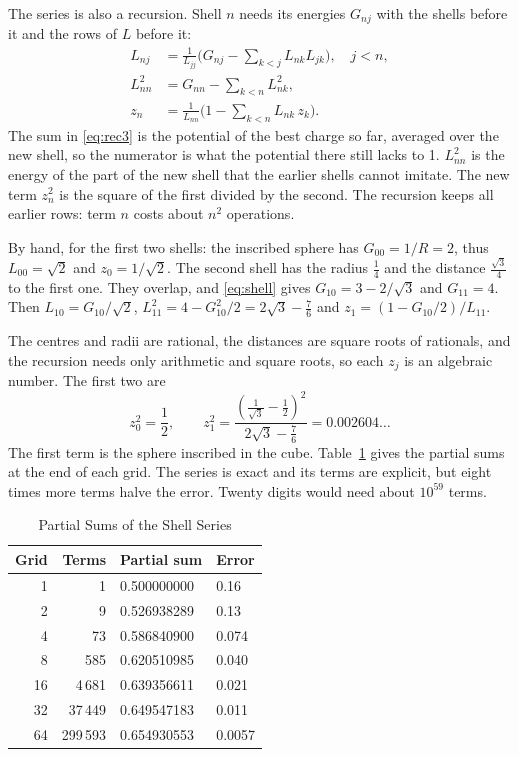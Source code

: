 \documentclass[journal]{IEEEtran}
\begin{document}
The series is also a recursion. Shell $n$ needs its energies $G_{nj}$ with the shells before it and the rows of $L$ before it:
\begin{align}
L_{nj} &= \frac{1}{L_{jj}}\Big(G_{nj} - \sum_{k<j} L_{nk} L_{jk}\Big), \quad j < n, \label{eq:rec1}\\
L_{nn}^2 &= G_{nn} - \sum_{k<n} L_{nk}^2, \label{eq:rec2}\\
z_n &= \frac{1}{L_{nn}}\Big(1 - \sum_{k<n} L_{nk}\, z_k\Big). \label{eq:rec3}
\end{align}
The sum in \eqref{eq:rec3} is the potential of the best charge so far, averaged over the new shell, so the numerator is what the potential there still lacks to 1. $L_{nn}^2$ is the energy of the part of the new shell that the earlier shells cannot imitate. The new term $z_n^2$ is the square of the first divided by the second. The recursion keeps all earlier rows: term $n$ costs about $n^2$ operations.

By hand, for the first two shells: the inscribed sphere has $G_{00} = 1/R = 2$, thus $L_{00} = \sqrt2$ and $z_0 = 1/\sqrt2$. The second shell has the radius $\frac14$ and the distance $\frac{\sqrt3}{4}$ to the first one. They overlap, and \eqref{eq:shell} gives $G_{10} = 3 - 2/\sqrt3$ and $G_{11} = 4$. Then $L_{10} = G_{10}/\sqrt2$, $L_{11}^2 = 4 - G_{10}^2/2 = 2\sqrt3 - \frac76$ and $z_1 = (1 - G_{10}/2)/L_{11}$.

The centres and radii are rational, the distances are square roots of rationals, and the recursion needs only arithmetic and square roots, so each $z_j$ is an algebraic number. The first two are
\begin{equation}
z_0^2 = \frac12, \qquad z_1^2 = \frac{\left(\frac1{\sqrt3}-\frac12\right)^2}{2\sqrt3-\frac76} = 0.002604\ldots
\end{equation}
The first term is the sphere inscribed in the cube. Table~\ref{tab:cumulative} gives the partial sums at the end of each grid. The series is exact and its terms are explicit, but eight times more terms halve the error. Twenty digits would need about $10^{59}$ terms.

\begin{table}[!t]
\caption{Partial Sums of the Shell Series}
\label{tab:cumulative}
\centering
\begin{tabular}{rrll}
\toprule
Grid & Terms & Partial sum & Error\\
\midrule
1 & 1 & 0.500000000 & 0.16\\
2 & 9 & 0.526938289 & 0.13\\
4 & 73 & 0.586840900 & 0.074\\
8 & 585 & 0.620510985 & 0.040\\
16 & 4\,681 & 0.639356611 & 0.021\\
32 & 37\,449 & 0.649547183 & 0.011\\
64 & 299\,593 & 0.654930553 & 0.0057\\
\bottomrule
\end{tabular}
\end{table}
\end{document}
